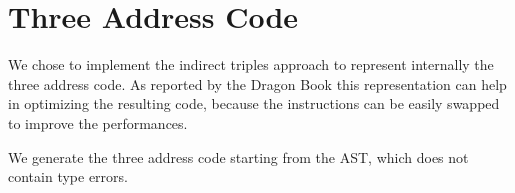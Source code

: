 \section{Three Address Code}
We chose to implement the indirect triples approach to represent internally
the three address code. As reported by the Dragon Book this representation 
can help in optimizing the resulting code, because the instructions can be 
easily swapped to improve the performances.

We generate the three address code starting from the AST, which does not contain
type errors.
